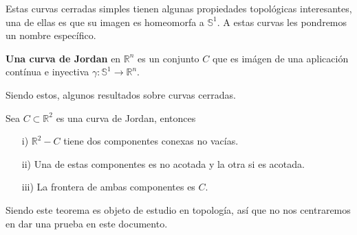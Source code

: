 \documentclass[oneside,11pt]{memoir}
\begin{document}
Estas curvas cerradas simples tienen algunas propiedades topológicas interesantes, una de ellas es que su imagen es homeomorfa a $\mathbb{S}^1$. A estas curvas les pondremos un nombre específico.
\begin{definition}
    \textbf{Una curva de Jordan} en $\mathbb{R}^n$ es un conjunto $C$ que es imágen de una aplicación contínua e inyectiva $\gamma:\mathbb{S}^1\to\mathbb{R}^n$.
\end{definition}
Siendo estos, algunos resultados sobre curvas cerradas.
\begin{theorem}
   Sea $C\subset \mathbb{R}^2$ es una curva de Jordan, entonces
   \begin{itemize}
       \item[i)] $\mathbb{R}^2-C$ tiene dos componentes conexas no vacías.
       \item[ii)] Una de estas componentes es no acotada y la otra si es acotada. 
       \item[iii)] La frontera de ambas componentes es $C$. 
   \end{itemize}
\end{theorem}
Siendo este teorema es objeto de estudio en topología, así que no nos centraremos en dar una prueba en este documento. 
\end{document}
